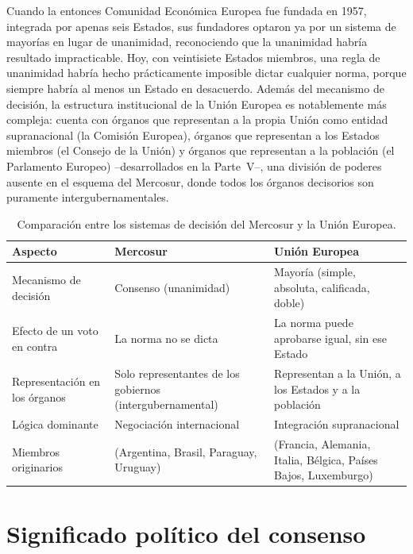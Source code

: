\documentclass[12pt,oneside]{book}
\begin{document}
Cuando la entonces Comunidad Económica Europea fue fundada en 1957, integrada por apenas seis Estados, sus fundadores optaron ya por un sistema de mayorías en lugar de unanimidad, reconociendo que la unanimidad habría resultado impracticable. Hoy, con veintisiete Estados miembros, una regla de unanimidad habría hecho prácticamente imposible dictar cualquier norma, porque siempre habría al menos un Estado en desacuerdo. Además del mecanismo de decisión, la estructura institucional de la Unión Europea es notablemente más compleja: cuenta con órganos que representan a la propia Unión como entidad supranacional (la Comisión Europea), órganos que representan a los Estados miembros (el Consejo de la Unión) y órganos que representan a la población (el Parlamento Europeo) --desarrollados en la Parte~V--, una división de poderes ausente en el esquema del Mercosur, donde todos los órganos decisorios son puramente intergubernamentales.

\begin{table}[H]
\centering
\renewcommand{\arraystretch}{1.3}
\begin{tabularx}{\textwidth}{>{\raggedright\arraybackslash}p{}>{\raggedright\arraybackslash}X>{\raggedright\arraybackslash}X}
\toprule
\textbf{Aspecto} & \textbf{Mercosur} & \textbf{Unión Europea} \\
\midrule
Mecanismo de decisión & Consenso (unanimidad) & Mayoría (simple, absoluta, calificada, doble) \\
Efecto de un voto en contra & La norma no se dicta & La norma puede aprobarse igual, sin ese Estado \\
Representación en los órganos & Solo representantes de los gobiernos (intergubernamental) & Representan a la Unión, a los Estados y a la población \\
Lógica dominante & Negociación internacional & Integración supranacional \\
Miembros originarios & 4 (Argentina, Brasil, Paraguay, Uruguay) & 6 (Francia, Alemania, Italia, Bélgica, Países Bajos, Luxemburgo) \\
\bottomrule
\end{tabularx}
\caption{Comparación entre los sistemas de decisión del Mercosur y la Unión Europea.}
\end{table}

\section{Significado político del consenso}
\end{document}
